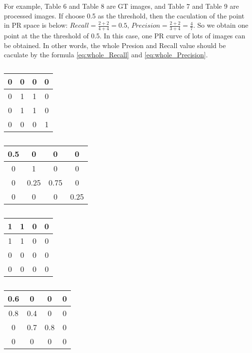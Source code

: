\documentclass[a4paper,12pt]{article}
\begin{document}
For example, Table 6 and Table 8 are GT images, and Table 7 and Table 9 are processed images. If choose 0.5 as the threshold, then the caculation of the point in PR space is below:
$Recall=\frac{2+2}{4+4}=0.5$, $Precision =\frac{2+2}{3+4}=\frac{4}{7}$.
So we obtain one point at the the threshold of 0.5. In this case, one PR curve of lots of images can be obtained. In other words, the whole Presion and Recall value should be caculate by the formula \ref{eq:whole_Recall} and \ref{eq:whole_Precision}.
\begin{table}[!ht]
\begin{minipage}[t]{0.17\linewidth}
\caption{}
\begin{tabular}{|c|c|c|c|}
\hline
0&0&0&0\\
\hline
0&1&1&0\\
\hline
0&1&1&0\\
\hline
0&0&0&1\\
\hline
\end{tabular} 
\end{minipage}
\begin{minipage}[t]{0.33\linewidth}
\caption{}
\begin{tabular}{|c|c|c|c|}
\hline
0.5&0&0&0\\
\hline
0&1&0&0\\
\hline
0&0.25&0.75&0\\
\hline
0&0&0&0.25\\
\hline
\end{tabular} 
\end{minipage}
\begin{minipage}[t]{0.2\linewidth}
\caption{}
\begin{tabular}{|c|c|c|c|}
\hline
1&1&0&0\\
\hline
1&1&0&0\\
\hline
0&0&0&0\\
\hline
0&0&0&0\\
\hline
\end{tabular} 
\end{minipage}
\begin{minipage}[t]{0.01\linewidth}
\caption{}
\begin{tabular}{|c|c|c|c|}
\hline
0.6&0&0&0\\
\hline
0.8&0.4&0&0\\
\hline
0&0.7&0.8&0\\
\hline
0&0&0&0\\
\hline
\end{tabular} 
\end{minipage}
\end{table}
\end{document}
